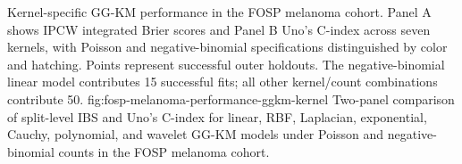 {Kernel-specific GG-KM performance in the FOSP melanoma cohort. Panel A
shows IPCW integrated Brier scores and Panel B Uno's C-index across seven kernels,
with Poisson and negative-binomial specifications distinguished by color
and hatching. Points represent successful outer holdouts. The
negative-binomial linear model contributes 15 successful fits; all other
kernel/count combinations contribute 50.}
{fig:fosp-melanoma-performance-ggkm-kernel}
{Two-panel comparison of split-level IBS and Uno's C-index for linear, RBF,
Laplacian, exponential, Cauchy, polynomial, and wavelet GG-KM models under
Poisson and negative-binomial counts in the FOSP melanoma cohort.}
